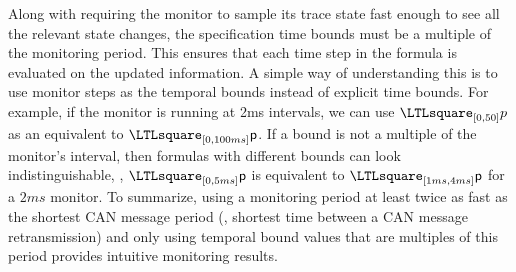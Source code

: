 Along with requiring the monitor to sample its trace state fast enough to see all the relevant state changes, the specification time bounds must be a multiple of the monitoring period.
This ensures that each time step in the formula is evaluated on the updated information.
A simple way of understanding this is to use monitor steps as the temporal bounds instead of explicit time bounds.
For example, if the monitor is running at  2ms intervals, we can use $\henceforth_{[0,50]} p$ as an equivalent to
$\henceforth_{[0,100ms]} \pred{p}$.
If a bound is not a multiple of the monitor's interval, then formulas with different bounds can look indistinguishable,
\eg, $\henceforth_{[0,5ms]} \pred{p}$ is equivalent to $\henceforth_{[1ms,4ms]} \pred{p}$ for a $2ms$ monitor.
%
To summarize, using a monitoring period at least twice as fast as the shortest
CAN message period (\ie, shortest time between a CAN message retransmission)
and only using temporal bound values that are multiples of this period provides intuitive monitoring results.


